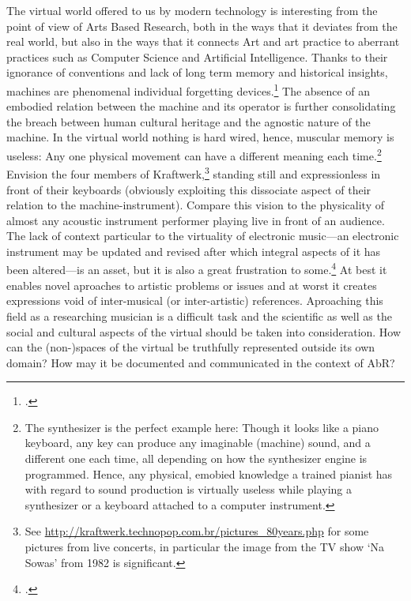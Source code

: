 The virtual world offered to us by modern technology is interesting from the point of view of Arts Based Research, both in the ways that it deviates from the real world, but also in the ways that it connects Art and art practice to aberrant practices such as Computer Science and Artificial Intelligence. Thanks to their ignorance of conventions and lack of long term memory and historical insights, machines are phenomenal individual forgetting devices.\footcite[See][]{miller04} The absence of an embodied relation between the machine and its operator is further consolidating the breach between human cultural heritage and the agnostic nature of the machine. In the virtual world nothing is hard wired, hence, muscular memory is useless: Any one physical movement can have a different meaning each time.\footnote{The synthesizer is the perfect example here: Though it looks like a piano keyboard, any key can produce any imaginable (machine) sound, and a different one each time, all depending on how the synthesizer engine is programmed. Hence, any physical, emobied knowledge a trained pianist has with regard to sound production is virtually useless while playing a synthesizer or a keyboard attached to a computer instrument.} Envision the four members of Kraftwerk,\footnote{See \url{http://kraftwerk.technopop.com.br/pictures\_80years.php} for some pictures from live concerts, in particular the image from the TV show `Na Sowas' from 1982 is significant.} standing still and expressionless in front of their keyboards (obviously exploiting this dissociate aspect of their relation to the machine-instrument). Compare this vision to the physicality of almost any acoustic instrument performer playing live in front of an audience. The lack of context particular to the virtuality of electronic music---an electronic instrument may be updated and revised after which integral aspects of it has been altered---is an asset, but it is also a great frustration to some.\footcite[E.g.][]{ostertag02} At best it enables novel aproaches to artistic problems or issues and at worst it creates expressions void of inter-musical (or inter-artistic) references. Aproaching this field as a researching musician is a difficult task and the scientific as well as the social and cultural aspects of the virtual should be taken into consideration. How can the (non-)spaces of the virtual be truthfully represented outside its own domain? How may it be documented and communicated in the context of AbR?


 
